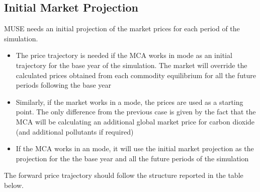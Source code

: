 \documentclass[letterpaper,10pt,english]{sphinxmanual}
\begin{document}
\subsection{Initial Market Projection}
\label{\detokenize{inputs/projections:initial-market-projection}}\label{\detokenize{inputs/projections:inputs-projection}}\label{\detokenize{inputs/projections::doc}}
MUSE needs an initial projection of the market prices for each period of the simulation.
\begin{itemize}
\item {} 
The price trajectory is needed if the MCA works in  mode as an initial
trajectory for the base year of the simulation. The market will override the
calculated prices obtained from each commodity equilibrium for all the future periods
following the base year

\item {} 
Similarly, if the market works in a  mode, the prices are used as a
starting point. The only difference from the previous case is given by the fact that
the MCA will be calculating an additional global market price for carbon dioxide (and
additional pollutants if required)

\item {} 
If the MCA works in an  mode, it will use the initial market projection as
the projection for the the base year and all the future periods of the simulation

\end{itemize}

The forward price trajectory should follow the structure reported in the table below.
\end{document}

